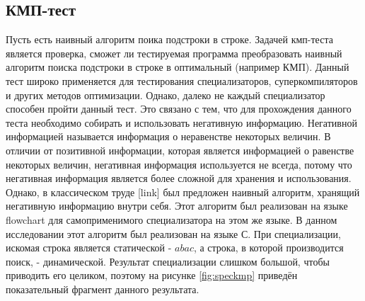 \documentclass{spbau-diploma}
\begin{document}
\subsection{ КМП-тест}
Пусть есть наивный алгоритм поика подстроки в строке. Задачей кмп-теста является проверка, сможет ли тестируемая программа преобразовать наивный алгоритм поиска подстроки в строке в оптимальный (например КМП). Данный тест широко применяется для тестирования специализаторов, суперкомпиляторов и других методов оптимизации. Однако, далеко не каждый специализатор способен пройти данный тест. Это связано с тем, что для прохождения данного теста необходимо собирать и использовать негативную информацию. Негативной информацией называется информация о неравенстве некоторых величин. В отличии от позитивной информации, которая является информацией о равенстве некоторых величин, негативная информация используется не всегда, потому что негативная информация является более сложной для хранения и использования. Однако, в классическом труде [link] был предложен наивный алгоритм, хранящий негативную информацию внутри себя. Этот алгоритм был реализован на языке flowchart для самоприменимого специализатора на этом же языке. В данном исследовании этот алгоритм был реализован на языке С.  При специализации, искомая строка является статической - $abac$, а строка, в которой производится поиск, - динамической. Результат специализации слишком большой, чтобы приводить его целиком, поэтому на рисунке \ref{fig:speckmp} приведён показательный фрагмент данного результата. 
\end{document}
